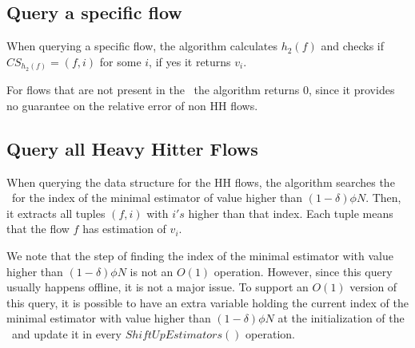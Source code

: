 
\subsection{Query a specific flow}
When querying a specific flow, the algorithm calculates $h_2(f)$ and checks if $CS_{h_2(f)}=(f,i)$ for some $i$, if yes it returns $v_i$.

For flows that are not present in the \cs\ the algorithm returns 0, since it provides no guarantee on the relative error of non HH flows.

\subsection{Query all Heavy Hitter Flows}
When querying the data structure for the HH flows, the algorithm searches the \sea\ for the index of the minimal estimator of value higher than $(1-\delta) \phi N$. Then, it extracts all tuples $(f, i)$ with $i's$ higher than that index. Each tuple means that the flow $f$ has estimation of $v_i$.

We note that the step of finding the index of the minimal estimator with value higher than $(1-\delta) \phi N$ is not an $O(1)$ operation. However, since this query usually happens offline, it is not a major issue. To support an $O(1)$ version of this query, it is possible to have an extra variable holding the current index of the minimal estimator with value higher than $(1-\delta) \phi N$ at the initialization of the \sea\ and update it in every $ShiftUpEstimators()$ operation.


